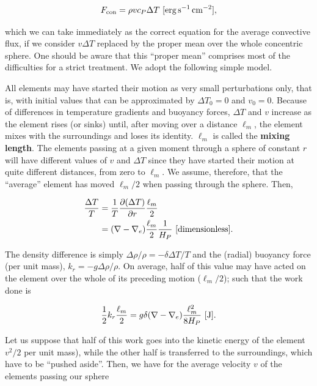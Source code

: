 \documentclass[a4paper,10pt]{article}
\begin{document}
\begin{align*}
    F_{\rm con} = \rho vc_P\Delta T ~ [{\rm erg\,s^{-1}\,cm^{-2}}],
\end{align*}

{\noindent}which we can take immediately as the correct equation for the average convective flux, if we consider $v\Delta T$ replaced by the proper mean over the whole concentric sphere. One should be aware that this ``proper mean'' comprises most of the difficulties for a strict treatment. We adopt the following simple model.

{\noindent}All elements may have started their motion as very small perturbations only, that is, with initial values that can be approximated by $\Delta T_0=0$ and $v_0=0$. Because of differences in temperature gradients and buoyancy forces, $\Delta T$ and $v$ increase as the element rises (or sinks) until, after moving over a distance $\ell_m$, the element mixes with the surroundings and loses its identity. $\ell_m$ is called the \textbf{mixing length}. The elements passing at a given moment through a sphere of constant $r$ will have different values of $v$ and $\Delta T$ since they have started their motion at quite different distances, from zero to $\ell_m$. We assume, therefore, that the ``average'' element has moved $\ell_m/2$ when passing through the sphere. Then,

\begin{align*}
    \frac{\Delta T}{T} &= \frac{1}{T} \frac{\partial(\Delta T)}{\partial r} \frac{\ell_m}{2} \\
    &= (\nabla-\nabla_e)\frac{\ell_m}{2}\frac{1}{H_P} ~ [{\rm dimensionless}].
\end{align*}

{\noindent}The density difference is simply $\Delta \rho/\rho=-\delta\Delta T/T$ and the (radial) buoyancy force (per unit mass), $k_r=-g\Delta\rho/\rho$. On average, half of this value may have acted on the element over the whole of its preceding motion ($\ell_m/2$); such that the work done is

\begin{align*}
    \frac{1}{2}k_r\frac{\ell_m}{2} = g\delta(\nabla-\nabla_e)\frac{\ell_m^2}{8H_P} ~ [{\rm J}].
\end{align*}

{\noindent}Let us suppose that half of this work goes into the kinetic energy of the element $v^2/2$ per unit mass), while the other half is transferred to the surroundings, which have to be ``pushed aside''. Then, we have for the average velocity $v$ of the elements passing our sphere
\end{document}
